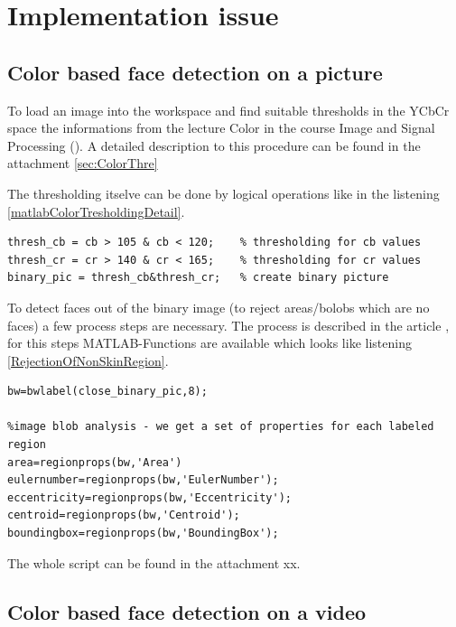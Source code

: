 \documentclass[Bachelorarbeit.tex]{subfiles}
\begin{document}
\chapter{Implementation issue}
\section{Color based face detection on a picture}
To load an image into the workspace and find suitable thresholds in the YCbCr space the informations from the lecture Color in the course Image and Signal Processing (\cite{RobAmaColor}). A detailed description to this procedure can be found in the attachment \ref{sec:ColorThre}

\medskip
The thresholding itselve can be done by logical operations like in the listening \ref{matlabColorTresholdingDetail}.

\begin{lstlisting}[caption=Color thresholding, label= matlabColorTresholdingDetail]
% Thresholding -> binary
thresh_cb = cb > 105 & cb < 120;    % thresholding for cb values
thresh_cr = cr > 140 & cr < 165;    % thresholding for cr values
binary_pic = thresh_cb&thresh_cr;   % create binary picture
\end{lstlisting}

\medskip
To detect faces out of the binary image (to reject areas/bolobs which are no faces) a few process steps are necessary. The process is described in the article \cite{RTFaceDetection}, for this steps MATLAB-Functions are available which looks like listening \ref{RejectionOfNonSkinRegion}.
\begin{lstlisting}[caption=Rejection of non Face Skin Region , label= RejectionOfNonSkinRegion]
%label all the connected components in the image
bw=bwlabel(close_binary_pic,8);

%image blob analysis - we get a set of properties for each labeled region
area=regionprops(bw,'Area')                    
eulernumber=regionprops(bw,'EulerNumber');      
eccentricity=regionprops(bw,'Eccentricity');    
centroid=regionprops(bw,'Centroid');            
boundingbox=regionprops(bw,'BoundingBox');
\end{lstlisting}

The whole script can be found in the attachment xx.



\section{Color based face detection on a video}
\end{document}
